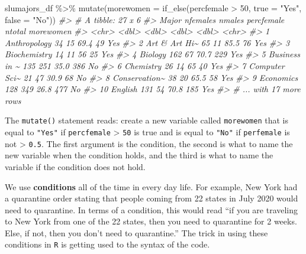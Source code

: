 \documentclass[
]{book}
\newenvironment{Shaded}{\begin{snugshade}}{\end{snugshade}}
\newcommand{\AttributeTok}[1]{\textcolor[rgb]{0.77,0.63,0.00}{#1}}
\newcommand{\CommentTok}[1]{\textcolor[rgb]{0.56,0.35,0.01}{\textit{#1}}}
\newcommand{\DecValTok}[1]{\textcolor[rgb]{0.00,0.00,0.81}{#1}}
\newcommand{\FunctionTok}[1]{\textcolor[rgb]{0.00,0.00,0.00}{#1}}
\newcommand{\NormalTok}[1]{#1}
\newcommand{\SpecialCharTok}[1]{\textcolor[rgb]{0.00,0.00,0.00}{#1}}
\newcommand{\StringTok}[1]{\textcolor[rgb]{0.31,0.60,0.02}{#1}}
\begin{document}
\begin{Shaded}
\begin{Highlighting}[]
\NormalTok{slumajors\_df }\SpecialCharTok{\%\textgreater{}\%} \FunctionTok{mutate}\NormalTok{(}\AttributeTok{morewomen =} \FunctionTok{if\_else}\NormalTok{(percfemale }\SpecialCharTok{\textgreater{}} \DecValTok{50}\NormalTok{,}
                                            \AttributeTok{true =} \StringTok{"Yes"}\NormalTok{,}
                                            \AttributeTok{false =} \StringTok{"No"}\NormalTok{))}
\CommentTok{\#\textgreater{} \# A tibble: 27 x 6}
\CommentTok{\#\textgreater{}    Major         nfemales nmales percfemale ntotal morewomen}
\CommentTok{\#\textgreater{}    \textless{}chr\textgreater{}            \textless{}dbl\textgreater{}  \textless{}dbl\textgreater{}      \textless{}dbl\textgreater{}  \textless{}dbl\textgreater{} \textless{}chr\textgreater{}    }
\CommentTok{\#\textgreater{}  1 Anthropology        34     15       69.4     49 Yes      }
\CommentTok{\#\textgreater{}  2 Art \& Art Hi\textasciitilde{}       65     11       85.5     76 Yes      }
\CommentTok{\#\textgreater{}  3 Biochemistry        14     11       56       25 Yes      }
\CommentTok{\#\textgreater{}  4 Biology            162     67       70.7    229 Yes      }
\CommentTok{\#\textgreater{}  5 Business in \textasciitilde{}      135    251       35.0    386 No       }
\CommentTok{\#\textgreater{}  6 Chemistry           26     14       65       40 Yes      }
\CommentTok{\#\textgreater{}  7 Computer Sci\textasciitilde{}       21     47       30.9     68 No       }
\CommentTok{\#\textgreater{}  8 Conservation\textasciitilde{}       38     20       65.5     58 Yes      }
\CommentTok{\#\textgreater{}  9 Economics          128    349       26.8    477 No       }
\CommentTok{\#\textgreater{} 10 English            131     54       70.8    185 Yes      }
\CommentTok{\#\textgreater{} \# ... with 17 more rows}
\end{Highlighting}
\end{Shaded}

The \texttt{mutate()} statement reads: create a new variable called \texttt{morewomen} that is equal to \texttt{"Yes"} if \texttt{percfemale} \textgreater{} \texttt{50} is true and is equal to \texttt{"No"} if \texttt{perfemale} is not \textgreater{} \texttt{0.5}. The first argument is the condition, the second is what to name the new variable when the condition holds, and the third is what to name the variable if the condition does not hold.

We use \textbf{conditions} all of the time in every day life. For example, New York had a quarantine order stating that people coming from 22 states in July 2020 would need to quarantine. In terms of a condition, this would read ``if you are traveling to New York from one of the 22 states, then you need to quarantine for 2 weeks. Else, if not, then you don't need to quarantine.'' The trick in using these conditions in \texttt{R} is getting used to the syntax of the code.
\end{document}

